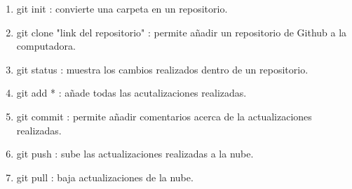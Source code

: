 \documentclass[letterpaper, 12pt, oneside]{article} %
\begin{document}
\begin{enumerate}
\begin{enumerate}
\begin{enumerate}
			\end{enumerate}
			\item git init : convierte una carpeta en un repositorio.
			\item git clone "link del repositorio" : permite añadir un repositorio de Github a la computadora.
			\item git status : muestra los cambios realizados dentro de un repositorio.
			\item git add * : añade todas las acutalizaciones realizadas.
			\item git commit : permite añadir comentarios acerca de la actualizaciones realizadas.
			\item git push : sube las actualizaciones realizadas a la nube.
			\item git pull : baja actualizaciones de la nube.
		\end{enumerate}
	\end{enumerate}
\end{document}
